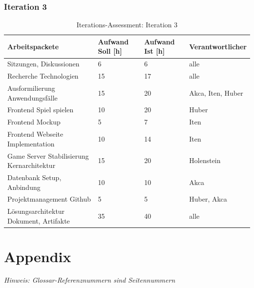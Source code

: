 \documentclass[11pt,ngerman]{article}
\begin{document}
    \subsubsection{Iteration 3}
    \begin{table}[H]
        \caption{Iterations-Assessment: Iteration 3}
        \begin{tabularx}{\textwidth}{l l l l}
            \toprule
            Arbeitspackete & Aufwand Soll [h] & Aufwand Ist [h] & Verantwortlicher \\
            \toprule
            Sitzungen, Diskussionen & 6 & 6 & alle \\
            Recherche Technologien & 15 & 17 & alle \\
            Ausformilierung Anwendungsfälle & 15 & 20 & Akca, Iten, Huber \\
            Frontend Spiel spielen & 10 & 20 & Huber \\
            Frontend Mockup & 5 & 7 & Iten \\
            Frontend Webseite Implementation & 10 & 14 & Iten \\
            Game Server Stabilisierung Kernarchitektur & 15 & 20 & Holenstein \\
            Datenbank Setup, Anbindung & 10 & 10 & Akca \\
            Projektmanagement Github & 5 & 5 & Huber, Akca \\
            Lösungsarchitektur Dokument, Artifakte & 35 & 40 & alle \\
            \bottomrule
        \end{tabularx}
        \label{tab:Iterations-Assessment: Iteration 3}
    \end{table}
     \newpage

    \section{Appendix}
    \textit{Hinweis: Glossar-Referenznummern sind Seitennummern}
    \printglossary
\end{document}

